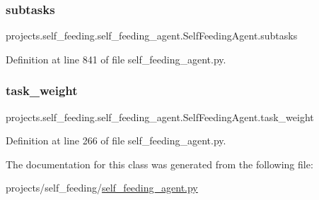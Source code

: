 \subsubsection{\texorpdfstring{subtasks}{subtasks}}
{\footnotesize\ttfamily projects.\+self\+\_\+feeding.\+self\+\_\+feeding\+\_\+agent.\+Self\+Feeding\+Agent.\+subtasks}



Definition at line 841 of file self\+\_\+feeding\+\_\+agent.\+py.

\mbox{\label{classprojects_1_1self__feeding_1_1self__feeding__agent_1_1SelfFeedingAgent_ab2d87eedf68d027424673ada89954fc1}} 
\subsubsection{\texorpdfstring{task\+\_\+weight}{task\_weight}}
{\footnotesize\ttfamily projects.\+self\+\_\+feeding.\+self\+\_\+feeding\+\_\+agent.\+Self\+Feeding\+Agent.\+task\+\_\+weight}



Definition at line 266 of file self\+\_\+feeding\+\_\+agent.\+py.



The documentation for this class was generated from the following file\+:\begin{DoxyCompactItemize}
\item 
projects/self\+\_\+feeding/\hyperlink{self__feeding__agent_8py}{self\+\_\+feeding\+\_\+agent.\+py}\end{DoxyCompactItemize}
